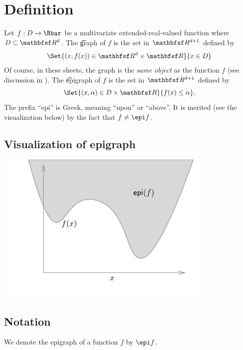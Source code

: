 
\section*{Definition}

Let $f: D \to \Rbar$ be a multivariate extended-real-valued function where $D \subset \R ^d$.
The \t{graph} of $f$ is the set in $\R ^{d + 1}$ defined by
\[
\Set{(x, f(x)) \in \R ^d \times  \R }{x \in D}
\]
Of course, in these sheets, the graph is the \textit{same object} as the function $f$ (see discussion in ).
The \t{epigraph} of $f$ is the set in $\R ^{d + 1}$ defined by
\[
\Set{(x, \alpha ) \in D \times  \R }{f(x) \leq \alpha }.
\]
The prefix ``epi'' is Greek, meaning ``upon'' or ``above''.
It is merited (see the visualization below) by the fact that $f \neq \epi f$.

\subsection*{Visualization of epigraph}

\begin{center}\includegraphics[width=0.80\textwidth]{./graphics/epi.pdf}\end{center}
\subsection*{Notation}

We denote the epigraph of a function $f$ by $\epi f$.



\blankpage